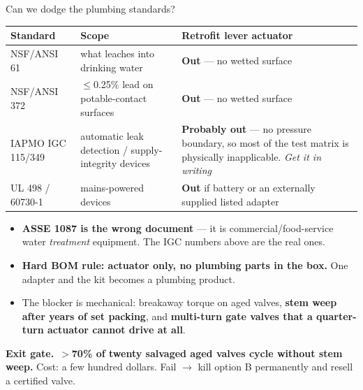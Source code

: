 \documentclass[aspectratio=169,t,10pt,xcolor={table,svgnames}]{beamer}
\newcommand{\gate}[1]{%
  \begin{beamercolorbox}[wd=\textwidth,sep=1.6ex]{}%
    \color{ink}\small\textbf{Exit gate.}\, #1%
  \end{beamercolorbox}}
\newcommand{\hd}[1]{\textbf{\footnotesize #1}}
\begin{document}
\begin{frame}{Can we dodge the plumbing standards?}
  \scriptsize
  \begin{tabular}{@{}p{}p{}p{}@{}}
    \toprule
    \hd{Standard} & \hd{Scope} & \hd{Retrofit lever actuator} \\
    \midrule
    NSF/ANSI 61 & what leaches into drinking water & \cellcolor{fill1}\textbf{Out} --- no wetted surface \\
    NSF/ANSI 372 & $\leq$0.25\% lead on potable-contact surfaces & \cellcolor{fill1}\textbf{Out} --- no wetted surface \\
    IAPMO IGC 115/349 & automatic leak detection / supply-integrity devices & \textbf{Probably out} --- no pressure boundary, so most of the test matrix is physically inapplicable. \emph{Get it in writing} \\
    UL 498 / 60730-1 & mains-powered devices & \cellcolor{fill1}\textbf{Out} if battery or an externally supplied listed adapter \\
    \bottomrule
  \end{tabular}
  \vspace{0.6em}
  \begin{itemize}\footnotesize
    \item \textbf{ASSE 1087 is the wrong document} --- it is commercial/food-service water
          \emph{treatment} equipment. The IGC numbers above are the real ones.
    \item \textbf{Hard BOM rule: actuator only, no plumbing parts in the box.} One adapter and the
          kit becomes a plumbing product.
    \item The blocker is mechanical: breakaway torque on aged valves, \textbf{stem weep after years
          of set packing}, and \textbf{multi-turn gate valves that a quarter-turn actuator cannot
          drive at all}.
  \end{itemize}
  \vspace{0.2em}
  \gate{\textbf{$>$70\% of twenty salvaged aged valves cycle without stem weep.} Cost: a few hundred
        dollars. Fail $\rightarrow$ kill option B permanently and resell a certified valve.}
\end{frame}
\end{document}
